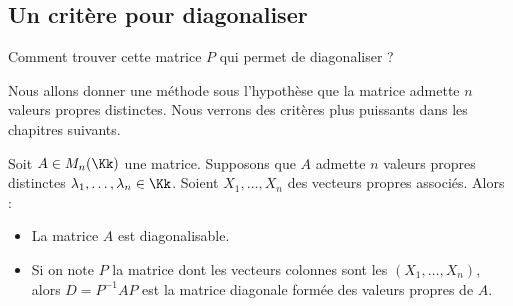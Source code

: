\documentclass[11pt, class=report,crop=false]{standalone}
\begin{document}
\subsection{Un critère pour diagonaliser}

Comment trouver cette matrice $P$ qui permet de diagonaliser ?

Nous allons donner une méthode sous l'hypothèse que la matrice admette $n$ valeurs propres distinctes.
Nous verrons des critères plus puissants dans les chapitres suivants.

\begin{proposition}
\label{prop:diagvpdis}
Soit $A \in M_n(\Kk)$ une matrice. Supposons que $A$ admette $n$ valeurs propres distinctes $\lambda_1,\ldots,\lambda_n \in \Kk$. Soient $X_1,\ldots,X_n$ des vecteurs propres associés. Alors :
\begin{itemize}
  \item La matrice $A$ est diagonalisable.
  
  \item Si on note $P$ la matrice dont les vecteurs colonnes sont les $(X_1,\ldots,X_n)$, alors $D=P^{-1}AP$ est la matrice diagonale formée des valeurs propres de $A$.
\end{itemize}
\end{proposition}
\end{document}
